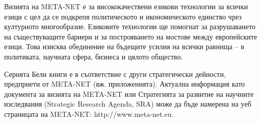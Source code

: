 \documentclass[]{../../metanetpaper}
\begin{document}
\begin{multicols}{2}
Визията на META-NET е за висококачествени езикови технологии за всички езици с цел да се подкрепя политическото и икономическото единство чрез културното многообразие. Езиковите технологии ще помогнат за разрушаването на съществуващите бариери и за построяването на мостове между европейските езици. Това изисква обединение на бъдещите усилия на всички равнища – в политиката, научната сфера, бизнеса и цялото общество.

Серията Бели книги е в съответствие с други стратегически дейности, предприети от META-NET (вж. приложенията). Актуална информация като документа за визията на META-NET \cite{Meta1} или Стратегията за развитие на научните изследвания (Strategic Research Agenda, SRA) може да бъде намерена на уеб страницата на META-NET: http://www.meta-net.eu.
\end{multicols}

\clearpage

\end{document}

